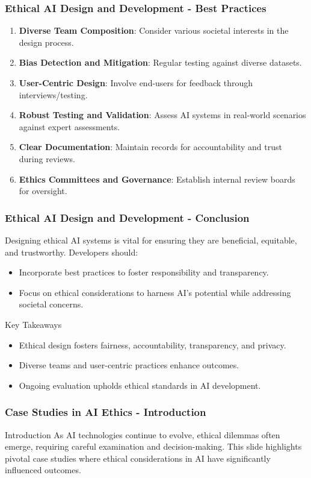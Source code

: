 \documentclass[aspectratio=169]{beamer}
\begin{document}
\begin{frame}[fragile]
  \frametitle{Ethical AI Design and Development - Best Practices}
  \begin{enumerate}
    \item \textbf{Diverse Team Composition}: Consider various societal interests in the design process.
    \item \textbf{Bias Detection and Mitigation}: Regular testing against diverse datasets.
    \item \textbf{User-Centric Design}: Involve end-users for feedback through interviews/testing.
    \item \textbf{Robust Testing and Validation}: Assess AI systems in real-world scenarios against expert assessments.
    \item \textbf{Clear Documentation}: Maintain records for accountability and trust during reviews.
    \item \textbf{Ethics Committees and Governance}: Establish internal review boards for oversight.
  \end{enumerate}
\end{frame}

\begin{frame}[fragile]
  \frametitle{Ethical AI Design and Development - Conclusion}
  Designing ethical AI systems is vital for ensuring they are beneficial, equitable, and trustworthy. Developers should:
  \begin{itemize}
    \item Incorporate best practices to foster responsibility and transparency.
    \item Focus on ethical considerations to harness AI's potential while addressing societal concerns.
  \end{itemize}

  \begin{block}{Key Takeaways}
    \begin{itemize}
      \item Ethical design fosters fairness, accountability, transparency, and privacy.
      \item Diverse teams and user-centric practices enhance outcomes.
      \item Ongoing evaluation upholds ethical standards in AI development.
    \end{itemize}
  \end{block}
\end{frame}

\begin{frame}[fragile]
    \frametitle{Case Studies in AI Ethics - Introduction}
    \begin{block}{Introduction}
        As AI technologies continue to evolve, ethical dilemmas often emerge, requiring careful examination and decision-making. This slide highlights pivotal case studies where ethical considerations in AI have significantly influenced outcomes.
    \end{block}
\end{frame}
\end{document}
